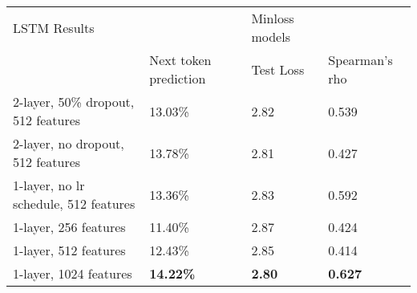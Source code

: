 \begin{table}[!ht]
  \centering
\begin{tabular}{|l|lll|}
\hline
LSTM Results                          &                                                     & Minloss models                     &                \\ \cline{2-4}
                                      & \multicolumn{1}{l|}{Next token prediction}          & \multicolumn{1}{l|}{Test Loss}     & Spearman's rho \\ \hline
2-layer, 50\% dropout, 512 features   & \multicolumn{1}{l|}{13.03\%}                        & \multicolumn{1}{l|}{2.82}          & 0.539          \\ \hline
2-layer, no dropout, 512 features     & \multicolumn{1}{l|}{13.78\%}                        & \multicolumn{1}{l|}{2.81}          & 0.427          \\ \hline
1-layer, no lr schedule, 512 features & \multicolumn{1}{l|}{13.36\%}                        & \multicolumn{1}{l|}{2.83}          & 0.592          \\ \hline
1-layer, 256 features                 & \multicolumn{1}{l|}{11.40\%}                        & \multicolumn{1}{l|}{2.87}          & 0.424          \\ \hline
1-layer, 512 features                 & \multicolumn{1}{l|}{12.43\%}                        & \multicolumn{1}{l|}{2.85}          & 0.414          \\ \hline
1-layer, 1024 features                & \multicolumn{1}{l|}{\textbf{14.22\%}}               & \multicolumn{1}{l|}{\textbf{2.80}} & \textbf{0.627} \\ \hline
\end{tabular}
\end{table}
